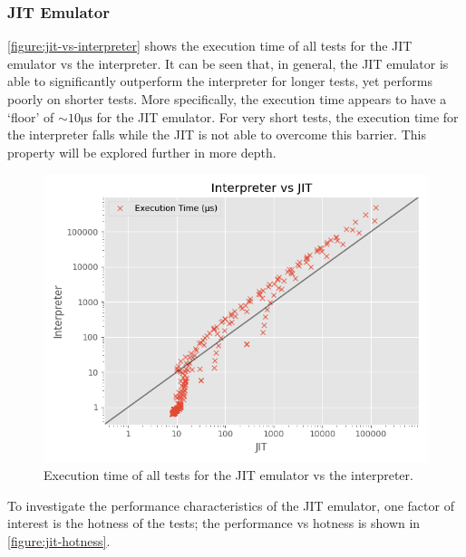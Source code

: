 \subsubsection{JIT Emulator}

\autoref{figure:jit-vs-interpreter} shows the execution time of all tests for the JIT emulator vs the interpreter. It can be seen that, in general, the JIT emulator is able to significantly outperform the interpreter for longer tests, yet performs poorly on shorter tests. More specifically, the execution time appears to have a `floor' of $\sim10\si{\micro\second}$ for the JIT emulator. For very short tests, the execution time for the interpreter falls while the JIT is not able to overcome this barrier. This property will be explored further in more depth.

\begin{figure}[H]
    \centering
    \includegraphics[scale=0.75]{output/graphs/scatter/vs/JIT-vs-Interpreter-time.png}
    \caption{Execution time of all tests for the JIT emulator vs the interpreter.}
    \label{figure:jit-vs-interpreter}
\end{figure}

To investigate the performance characteristics of the JIT emulator, one factor of interest is the hotness of the tests; the performance vs hotness is shown in \autoref{figure:jit-hotness}.

